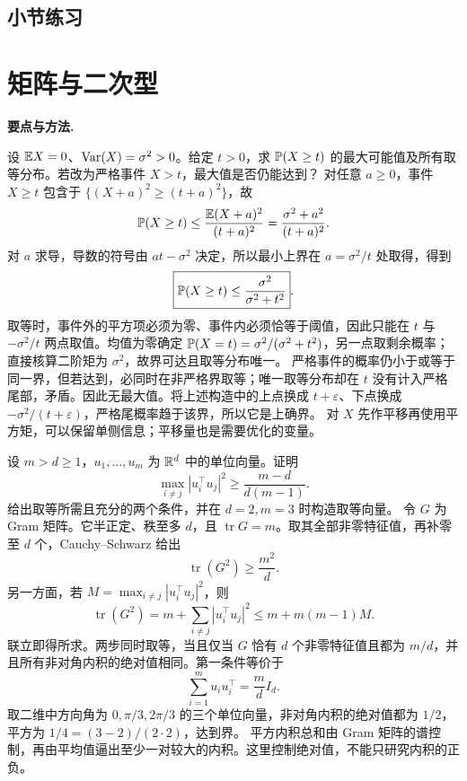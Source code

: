 \subsection*{小节练习}


\section{矩阵与二次型}
\noindent\textbf{要点与方法.}\enspace





设 $\mathbb{E} X=0$、$\operatorname{Var}(X)=\sigma^2>0$。给定 $t>0$，求 $\mathbb{P}(X\ge t)$ 的最大可能值及所有取等分布。若改为严格事件 $X>t$，最大值是否仍能达到？
\solution 对任意 $a\ge0$，事件 $X\ge t$ 包含于 $\{(X+a)^2\ge(t+a)^2\}$，故
\[
 \mathbb{P}(X\ge t)\le\frac{\mathbb{E}(X+a)^2}{(t+a)^2}
 =\frac{\sigma^2+a^2}{(t+a)^2}.
\]
对 $a$ 求导，导数的符号由 $at-\sigma^2$ 决定，所以最小上界在 $a=\sigma^2/t$ 处取得，得到
\[
 \boxed{\mathbb{P}(X\ge t)\le\frac{\sigma^2}{\sigma^2+t^2}}.
\]
取等时，事件外的平方项必须为零、事件内必须恰等于阈值，因此只能在 $t$ 与 $-\sigma^2/t$ 两点取值。均值为零确定 $\mathbb{P}(X=t)=\sigma^2/(\sigma^2+t^2)$，另一点取剩余概率；直接核算二阶矩为 $\sigma^2$，故界可达且取等分布唯一。
严格事件的概率仍小于或等于同一界，但若达到，必同时在非严格界取等；唯一取等分布却在 $t$ 没有计入严格尾部，矛盾。因此无最大值。将上述构造中的上点换成 $t+\varepsilon$、下点换成 $-\sigma^2/(t+\varepsilon)$，严格尾概率趋于该界，所以它是上确界。
\insight 对 $X$ 先作平移再使用平方矩，可以保留单侧信息；平移量也是需要优化的变量。

设 $m>d\ge1$，$u_1,\ldots,u_m$ 为 $\mathbb{R}^d$ 中的单位向量。证明
\[
 \max_{i\ne j}|u_i^\top u_j|^2\ge\frac{m-d}{d(m-1)}.
\]
给出取等所需且充分的两个条件，并在 $d=2,m=3$ 时构造取等向量。
\solution 令 $G$ 为 Gram 矩阵。它半正定、秩至多 $d$，且 $\operatorname{tr}G=m$。取其全部非零特征值，再补零至 $d$ 个，Cauchy--Schwarz 给出
\[
 \operatorname{tr}(G^2)\ge\frac{m^2}{d}.
\]
另一方面，若 $M=\max_{i\ne j}|u_i^\top u_j|^2$，则
\[
 \operatorname{tr}(G^2)=m+\sum_{i\ne j}|u_i^\top u_j|^2
 \le m+m(m-1)M.
\]
联立即得所求。两步同时取等，当且仅当 $G$ 恰有 $d$ 个非零特征值且都为 $m/d$，并且所有非对角内积的绝对值相同。第一条件等价于
\[
 \sum_{i=1}^m u_i u_i^\top=\frac md I_d.
\]
取二维中方向角为 $0,\pi/3,2\pi/3$ 的三个单位向量，非对角内积的绝对值都为 $1/2$，平方为 $1/4=(3-2)/(2\cdot2)$，达到界。
\insight 平方内积总和由 Gram 矩阵的谱控制，再由平均值逼出至少一对较大的内积。这里控制绝对值，不能只研究内积的正负。

